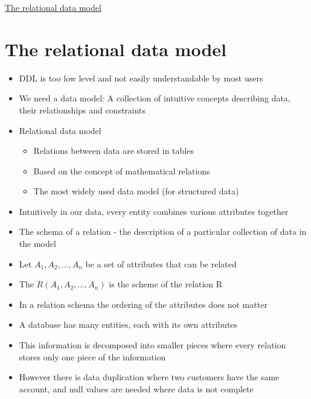 \documentclass{article}[18pt]
\begin{document}
\begin{center}
\underline{\huge The relational data model}
\end{center}
\section{The relational data model}
\begin{itemize}
	\item DDL is too low level and not easily understandable by most users
	\item We need a data model: A collection of intuitive concepts describing data, their relationships and constraints
	\item Relational data model
	\begin{itemize}
		\item Relations between data are stored in tables
		\item Based on the concept of mathematical relations
		\item The most widely used data model (for structured data)
	\end{itemize}
	\item Intuitively in our data, every entity combines various attributes together
	\item The schema of a relation - the description of a particular collection of data in the model
	\item Let $A_1,A_2,...,A_n$ be a set of attributes that can be related
	\item The $R(A_1,A_2,...,A_n)$ is the scheme of the relation R
	\item In a relation schema the ordering of the attributes does not matter
	\item A database has many entities, each with its own attributes
	\item This information is decomposed into smaller pieces where every relation stores only one piece of the information
	\item However there is data duplication where two customers have the same account, and null values are needed where data is not complete
\end{itemize}
\end{document}

